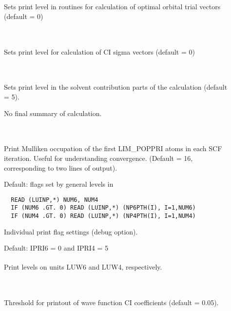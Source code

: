 \begin{description}
\item[] \ \\
   \\
  Sets print level in routines for calculation of optimal orbital trial
  vectors (default = 0)

\item[] \ \\
   \\
  Sets print level for calculation of CI sigma vectors (default = 0)

\item[] \ \\
   \\
  Sets print level in the solvent contribution parts of the
  calculation (default = 5).

\item[]
  No final summary of calculation.

\item[] \ \\
   \\
  Print Mulliken occupation of the first LIM\_POPPRI atoms in
  each SCF iteration. Useful for understanding convergence.
  (Default = 16, corresponding to two lines of output).

\item[]
 Default: flags set by general levels in 
\begin{verbatim}
  READ (LUINP,*) NUM6, NUM4
  IF (NUM6 .GT. 0) READ (LUINP,*) (NP6PTH(I), I=1,NUM6)
  IF (NUM4 .GT. 0) READ (LUINP,*) (NP4PTH(I), I=1,NUM4)
\end{verbatim}
  Individual print flag settings (debug option).

\item[]
  Default: IPRI6 = 0 and IPRI4 = 5 \\
   \\
  Print levels on units LUW6 and LUW4, respectively.
%
%
\item[] \ \\
   \\
  Threshold for printout of wave function CI coefficients (default = 0.05).
 \end{description}



